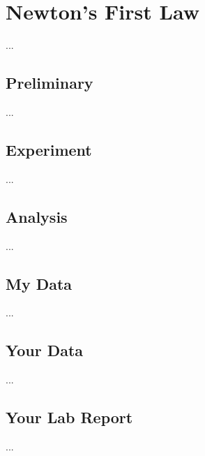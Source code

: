 \chapter{Newton's First Law}
...
\section{Preliminary}
...
\section{Experiment}
...
\section{Analysis}
...
\section{My Data}
...
\section{Your Data}
...
\section{Your Lab Report}
...